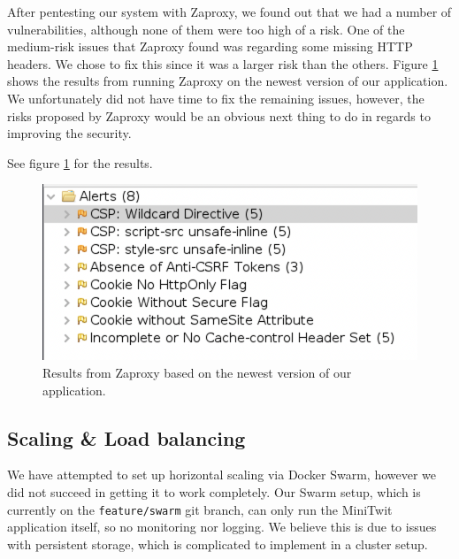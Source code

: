 
After pentesting our system with Zaproxy, we found out that we had a number of vulnerabilities, although none of them were too high of a risk. 
One of the medium-risk issues that Zaproxy found was regarding some missing HTTP headers. We chose to fix this since it was a larger risk than the others. Figure \ref{fig:Zaproxy_Updated} shows the results from running Zaproxy on the newest version of our application. We unfortunately did not have time to fix the remaining issues, however, the risks proposed by Zaproxy would be an obvious next thing to do in regards to improving the security.

See figure \ref{fig:Zaproxy_Updated} for the results.

\begin{figure}[H]
    \centering
    \includegraphics[scale=0.50]{images/security_risks_updated.png}
    \caption{Results from Zaproxy based on the newest version of our application.}
    \label{fig:Zaproxy_Updated}
\end{figure}


\subsection{Scaling \& Load balancing}

We have attempted to set up horizontal scaling via Docker Swarm, however we did not succeed in getting it to work completely. Our Swarm setup, which is currently on the \texttt{feature/swarm} git branch, can only run the MiniTwit application itself, so no monitoring nor logging. We believe this is due to issues with persistent storage, which is complicated to implement in a cluster setup.